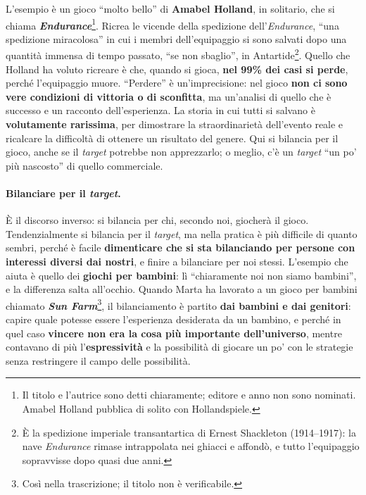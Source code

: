 L'esempio è un gioco ``molto bello'' di \textbf{Amabel Holland}, in solitario, che si chiama
\textbf{\emph{Endurance}}\footnote{Il titolo e l'autrice sono detti chiaramente; editore e
anno non sono nominati. Amabel Holland pubblica di solito con Hollandspiele.}. Ricrea le
vicende della spedizione dell'\emph{Endurance}, ``una spedizione miracolosa'' in cui i membri
dell'equipaggio si sono salvati dopo una quantità immensa di tempo passato, ``se non
sbaglio'', in Antartide\footnote{È la spedizione imperiale transantartica di Ernest
Shackleton (1914--1917): la nave \emph{Endurance} rimase intrappolata nei ghiacci e affondò,
e tutto l'equipaggio sopravvisse dopo quasi due anni.}. Quello che Holland ha voluto ricreare
è che, quando si gioca, \textbf{nel 99\% dei casi si perde}, perché l'equipaggio muore.
``Perdere'' è un'imprecisione: nel gioco \textbf{non ci sono vere condizioni di vittoria o di
sconfitta}, ma un'analisi di quello che è successo e un racconto dell'esperienza. La storia in
cui tutti si salvano è \textbf{volutamente rarissima}, per dimostrare la straordinarietà
dell'evento reale e ricalcare la difficoltà di ottenere un risultato del genere. Qui si
bilancia per il gioco, anche se il \emph{target} potrebbe non apprezzarlo; o meglio, c'è un
\emph{target} ``un po' più nascosto'' di quello commerciale.

\paragraph{Bilanciare per il \emph{target}.} È il discorso inverso: si bilancia per chi,
secondo noi, giocherà il gioco. Tendenzialmente si bilancia per il \emph{target}, ma nella
pratica è più difficile di quanto sembri, perché è facile \textbf{dimenticare che si sta
bilanciando per persone con interessi diversi dai nostri}, e finire a bilanciare per noi
stessi. L'esempio che aiuta è quello dei \textbf{giochi per bambini}: lì ``chiaramente noi non
siamo bambini'', e la differenza salta all'occhio. Quando Marta ha lavorato a un gioco per
bambini chiamato \textbf{\emph{Sun Farm}}\footnote{Così nella trascrizione; il titolo non è
verificabile.}, il bilanciamento è partito \textbf{dai bambini e dai genitori}: capire quale
potesse essere l'esperienza desiderata da un bambino, e perché in quel caso \textbf{vincere
non era la cosa più importante dell'universo}, mentre contavano di più
l'\textbf{espressività} e la possibilità di giocare un po' con le strategie senza restringere
il campo delle possibilità.

